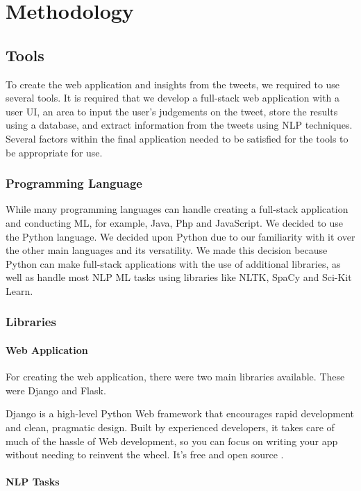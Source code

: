 \chapter{Methodology}
	\label{chap:typesetting}
	
	\section{Tools}
	To create the web application and insights from the tweets, we required to use several tools. It is required that we develop a full-stack web application with a user UI, an area to input the user's judgements on the tweet, store the results using a database, and extract information from the tweets using NLP techniques. Several factors within the final application needed to be satisfied for the tools to be appropriate for use.
	
	\subsection{Programming Language}
	While many programming languages can handle creating a full-stack application and conducting ML, for example, Java, Php and JavaScript. We decided to use the Python language. We decided upon Python due to our familiarity with it over the other main languages and its versatility. We made this decision because Python can make full-stack applications with the use of additional libraries, as well as handle most NLP ML tasks using libraries like NLTK, SpaCy and Sci-Kit Learn.
	
	\subsection{Libraries}
	\subsubsection{Web Application}
	For creating the web application, there were two main libraries available. These were Django and Flask.
	
	Django is a high-level Python Web framework that encourages rapid development and clean, pragmatic design. Built by experienced developers, it takes care of much of the hassle of Web development, so you can focus on writing your app without needing to reinvent the wheel. It’s free and open source \cite{django}.
	
	\subsubsection{NLP Tasks}
	
